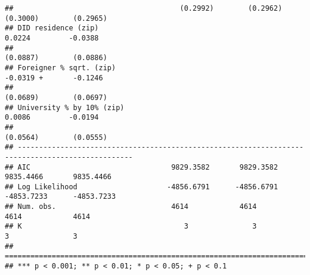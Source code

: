 \documentclass[
]{article}
\begin{document}
\begin{verbatim}
##                                       (0.2992)        (0.2962)        (0.3000)        (0.2965)   
## DID residence (zip)                                                    0.0224         -0.0388    
##                                                                       (0.0887)        (0.0886)   
## Foreigner % sqrt. (zip)                                               -0.0319 +       -0.1246    
##                                                                       (0.0689)        (0.0697)   
## University % by 10% (zip)                                              0.0086         -0.0194    
##                                                                       (0.0564)        (0.0555)   
## -------------------------------------------------------------------------------------------------
## AIC                                 9829.3582       9829.3582       9835.4466       9835.4466    
## Log Likelihood                     -4856.6791      -4856.6791      -4853.7233      -4853.7233    
## Num. obs.                           4614            4614            4614            4614         
## K                                      3               3               3               3         
## =================================================================================================
## *** p < 0.001; ** p < 0.01; * p < 0.05; + p < 0.1
\end{verbatim}
\end{document}
